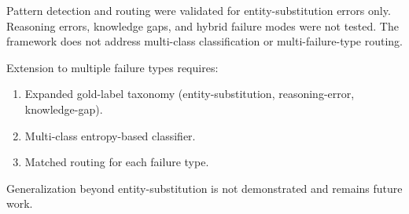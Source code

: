 Pattern detection and routing were validated for entity-substitution errors only. Reasoning errors, knowledge gaps, and hybrid failure modes were not tested. The framework does not address multi-class classification or multi-failure-type routing.

Extension to multiple failure types requires:

\begin{enumerate}
\item Expanded gold-label taxonomy (entity-substitution, reasoning-error, knowledge-gap).
\item Multi-class entropy-based classifier.
\item Matched routing for each failure type.
\end{enumerate}

Generalization beyond entity-substitution is not demonstrated and remains future work.
